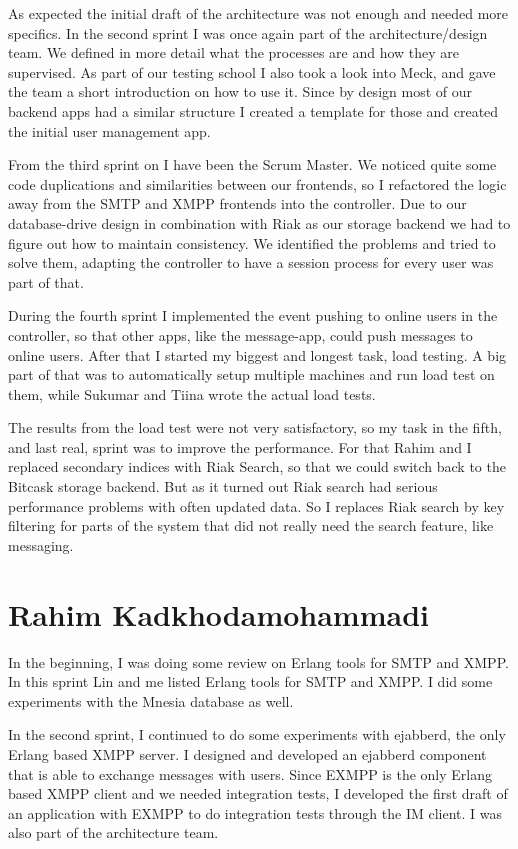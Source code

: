 \documentclass[11pt,a4paper]{report}
\begin{document}
As expected the initial draft of the architecture was not enough and needed more
specifics. In the second sprint I was once again part of the architecture/design
team. We defined in more detail what the processes are and how they are
supervised. As part of our testing school I also took a look into Meck, and gave
the team a short introduction on how to use it. Since by design most of our
backend apps had a similar structure I created a template for those and created
the initial user management app.

From the third sprint on I have been the Scrum Master. We noticed quite some
code duplications and similarities between our frontends, so I refactored the
logic away from the SMTP and XMPP frontends into the controller. Due to our
database-drive design in combination with Riak as our storage backend we had to
figure out how to maintain consistency. We identified the problems and tried to
solve them, adapting the controller to have a session process for every user was
part of that.

During the fourth sprint I implemented the event pushing to online users in the
controller, so that other apps, like the message-app, could push messages to
online users. After that I started my biggest and longest task, load testing. A
big part of that was to automatically setup multiple machines and run load test
on them, while Sukumar and Tiina wrote the actual load tests.

The results from the load test were not very satisfactory, so my task in the
fifth, and last real, sprint was to improve the performance. For that Rahim and
I replaced secondary indices with Riak Search, so that we could switch back to
the Bitcask storage backend. But as it turned out Riak search had serious
performance problems with often updated data.  So I replaces Riak search by key
filtering for parts of the system that did not really need the search feature,
like messaging.

\section{Rahim Kadkhodamohammadi}
In the beginning, I was doing some review on Erlang tools for SMTP and XMPP. In
this sprint Lin and me listed Erlang tools for SMTP and XMPP. I did some
experiments with the Mnesia database as well.

In the second sprint, I continued to do some experiments with ejabberd, the only
Erlang based XMPP server. I designed and developed an ejabberd component that is
able to exchange messages with users. Since EXMPP is the only Erlang based XMPP
client and we needed integration tests, I developed the first draft of an
application with EXMPP to do integration tests through the IM client. I was also
part of the architecture team.
\end{document}
